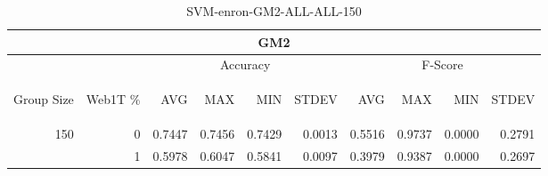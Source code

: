 \begin{center}
\begin{table}[htbp] 
 \begin{center}
\begin{tabular}{ | r | r | r | r | r | r | r | r | r | r |}
\hline
\multicolumn{10}{|c|}{GM2}\\
\hline
 & & \multicolumn{4}{|c|}{Accuracy} & \multicolumn{4}{|c|}{F-Score}\\ \cline{3-10}
\begin{sideways}Group Size\end{sideways} & \begin{sideways}Web1T \%\end{sideways} & \begin{sideways}AVG\end{sideways} & \begin{sideways}MAX\end{sideways} & \begin{sideways}MIN\end{sideways} & \begin{sideways}STDEV\end{sideways} & \begin{sideways}AVG\end{sideways} & \begin{sideways}MAX\end{sideways} & \begin{sideways}MIN\end{sideways} & \begin{sideways}STDEV\end{sideways}\\
\hline
\multirow{1}{*}{150}
 & 0 & 0.7447 & 0.7456 & 0.7429 & 0.0013 & 0.5516 & 0.9737 & 0.0000 & 0.2791\\ \cline{2-10}
 & 1 & 0.5978 & 0.6047 & 0.5841 & 0.0097 & 0.3979 & 0.9387 & 0.0000 & 0.2697\\ \cline{2-10}
\hline
\end{tabular}
\caption{SVM-enron-GM2-ALL-ALL-150}
\label{table:SVM-enron-GM2-ALL-ALL-150}
\end{center}
 \end{table}
\end{center}

